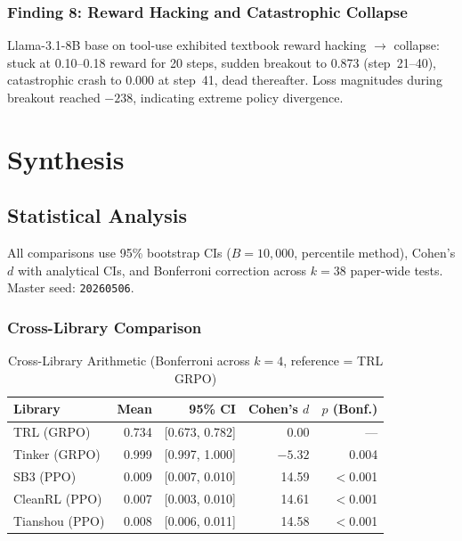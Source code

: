 \documentclass[12pt,a4paper]{report}
\theoremstyle{definition}
\begin{document}
\section{Finding 8: Reward Hacking and Catastrophic Collapse}
\label{sec:f8-collapse}

Llama-3.1-8B base on tool-use exhibited textbook reward hacking $\to$ collapse:
stuck at 0.10--0.18 reward for 20 steps, sudden breakout to 0.873 (step~21--40),
catastrophic crash to 0.000 at step~41, dead thereafter.
Loss magnitudes during breakout reached $-238$, indicating extreme policy divergence.



\part{Synthesis}


\chapter{Statistical Analysis}
\label{ch:statistics}

All comparisons use 95\% bootstrap CIs ($B=10{,}000$, percentile method), Cohen's $d$ with analytical CIs,
and Bonferroni correction across $k=38$ paper-wide tests. Master seed: \texttt{20260506}.

\section{Cross-Library Comparison}
\label{sec:cross-lib-stats}

\begin{table}[htbp]
\centering
\caption{Cross-Library Arithmetic (Bonferroni across $k=4$, reference = TRL GRPO)}
\label{tab:cross-lib}
\begin{tabular}{lrrrr}
\toprule
\textbf{Library} & \textbf{Mean} & \textbf{95\% CI} & \textbf{Cohen's $d$} & \textbf{$p$ (Bonf.)} \\
\midrule
TRL (GRPO) & 0.734 & [0.673, 0.782] & 0.00 & --- \\
Tinker (GRPO) & 0.999 & [0.997, 1.000] & $-5.32$ & 0.004 \\
SB3 (PPO) & 0.009 & [0.007, 0.010] & 14.59 & $<$0.001 \\
CleanRL (PPO) & 0.007 & [0.003, 0.010] & 14.61 & $<$0.001 \\
Tianshou (PPO) & 0.008 & [0.006, 0.011] & 14.58 & $<$0.001 \\
\bottomrule
\end{tabular}
\end{table}
\end{document}
